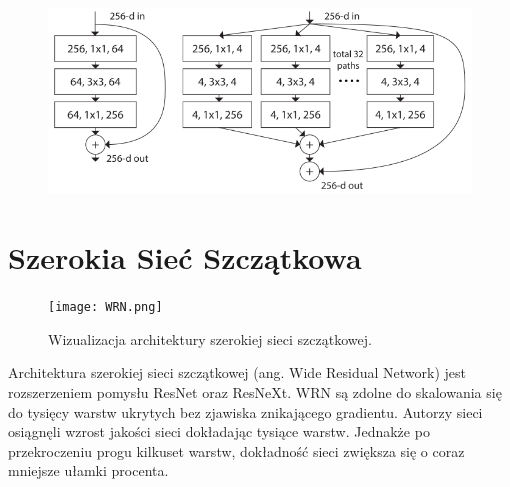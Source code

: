 \documentclass[12pt,a4paper,twoside,titlepage,openright]{book}
\begin{document}
\begin{itemize}
\begin{itemize}
\begin{figure}[ht]
	\centering
			\includegraphics[resolution=100]{resnextModule.png}
		\caption{}
				\label{fig:resnextModule}
\end{figure}


\cite{DBLP:journals/corr/abs-1805-08700}


\section{Szerokia Sieć Szczątkowa}
\begin{figure}[ht]
 	\centering
 			\texttt{[image: WRN.png]}
 		\caption{Wizualizacja architektury szerokiej sieci szczątkowej.}
 \end{figure}

Architektura szerokiej sieci szczątkowej (ang. Wide Residual Network) jest rozszerzeniem pomysłu ResNet oraz ResNeXt. WRN są zdolne do skalowania się do tysięcy warstw ukrytych bez zjawiska znikającego gradientu. Autorzy sieci osiągnęli wzrost jakości sieci dokładając tysiące warstw. Jednakże po przekroczeniu progu kilkuset warstw, dokładność sieci zwiększa się o coraz mniejsze ułamki procenta. \cite{}


\end{itemize}
\end{itemize}
\end{document}
